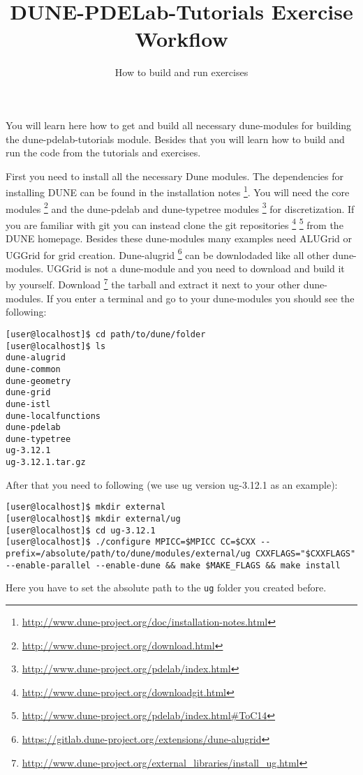 \documentclass[12pt,a4paper]{article}
\title{\textbf{DUNE-PDELab-Tutorials Exercise Workflow}}
\subtitle{How to build and run exercises}
\begin{document}
\exerciseheader

You will learn here how to get and build all necessary dune-modules
for building the dune-pdelab-tutorials module.  Besides that you will
learn how to build and run the code from the tutorials and exercises.

First you need to install all the necessary Dune modules.  The
dependencies for installing DUNE can be found in the installation
notes
\footnote{\href{http://www.dune-project.org/doc/installation-notes.html}{http://www.dune-project.org/doc/installation-notes.html}}.
You will need the core modules
\footnote{\href{http://www.dune-project.org/download.html}{http://www.dune-project.org/download.html}}
and the dune-pdelab and dune-typetree modules
\footnote{\href{http://www.dune-project.org/pdelab/index.html}{http://www.dune-project.org/pdelab/index.html}}
for discretization.  If you are familiar with git you can instead
clone the git repositories
\footnote{\href{http://www.dune-project.org/downloadgit.html}{http://www.dune-project.org/downloadgit.html}}
\footnote{\href{http://www.dune-project.org/pdelab/index.html\#ToC14}{http://www.dune-project.org/pdelab/index.html\#ToC14}}
from the DUNE homepage.  Besides these dune-modules many examples need
ALUGrid or UGGrid for grid creation.  Dune-alugrid
\footnote{\href{https://gitlab.dune-project.org/extensions/dune-alugrid}{https://gitlab.dune-project.org/extensions/dune-alugrid}}
can be downlodaded like all other dune-modules.  UGGrid is not a
dune-module and you need to download and build it by yourself.
Download
\footnote{\href{http://www.dune-project.org/external\_libraries/install_ug.html}{http://www.dune-project.org/external\_libraries/install\_ug.html}}
the tarball and extract it next to your other dune-modules.  If you
enter a terminal and go to your dune-modules you should see the
following: \lstset{language=bash} %
\begin{lstlisting}
[user@localhost]$ cd path/to/dune/folder
[user@localhost]$ ls
dune-alugrid
dune-common
dune-geometry
dune-grid
dune-istl
dune-localfunctions
dune-pdelab
dune-typetree
ug-3.12.1
ug-3.12.1.tar.gz
\end{lstlisting}
After that you need to following (we use ug version ug-3.12.1 as an
example):
\begin{lstlisting}
[user@localhost]$ mkdir external
[user@localhost]$ mkdir external/ug
[user@localhost]$ cd ug-3.12.1
[user@localhost]$ ./configure MPICC=$MPICC CC=$CXX --prefix=/absolute/path/to/dune/modules/external/ug CXXFLAGS="$CXXFLAGS" --enable-parallel --enable-dune && make $MAKE_FLAGS && make install
\end{lstlisting}
Here you have to set the absolute path to the \lstinline{ug} folder
you created before.
\end{document}
